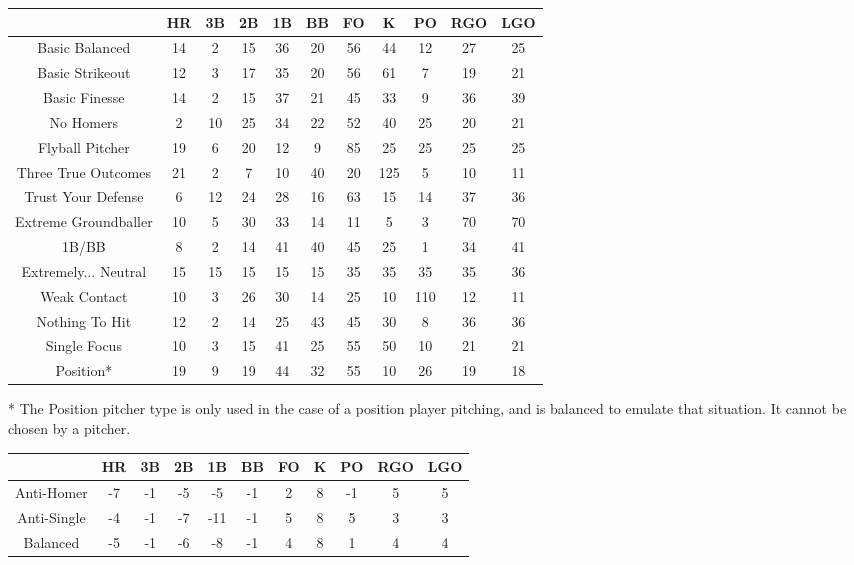 \begin{center}
    \begin{tabular}{|c|c|c|c|c|c|c|c|c|c|c|}
		\hline
        & HR & 3B & 2B & 1B & BB & FO & K   & PO & RGO & LGO    \\
        \hline
Basic Balanced & 14 & 2 & 15 & 36 & 20 & 56 & 44 & 12 & 27 & 25 \\
\hline
Basic Strikeout & 12 & 3 & 17 & 35 & 20 & 56 & 61 & 7 & 19 & 21 \\
\hline
Basic Finesse & 14 & 2 & 15 & 37 & 21 & 45 & 33 & 9 & 36 & 39 \\
\hline
No Homers & 2 & 10 & 25 & 34 & 22 & 52 & 40 & 25 & 20 & 21 \\
\hline
Flyball Pitcher & 19 & 6 & 20 & 12 & 9 & 85 & 25 & 25 & 25 & 25 \\
\hline
Three True Outcomes & 21 & 2 & 7 & 10 & 40 & 20 & 125 & 5 & 10 & 11 \\
\hline
Trust Your Defense & 6 & 12 & 24 & 28 & 16 & 63 & 15 & 14 & 37 & 36 \\
\hline
Extreme Groundballer & 10 & 5 & 30 & 33 & 14 & 11 & 5 & 3 & 70 & 70 \\
\hline
1B/BB & 8 & 2 & 14 & 41 & 40 & 45 & 25 & 1 & 34 & 41 \\
\hline
Extremely... Neutral & 15 & 15 & 15 & 15 & 15 & 35 & 35 & 35 & 35 & 36 \\
\hline
Weak Contact & 10 & 3 & 26 & 30 & 14 & 25 & 10 & 110 & 12 & 11 \\
\hline
Nothing To Hit & 12 & 2 & 14 & 25 & 43 & 45 & 30 & 8 & 36 & 36 \\
\hline
Single Focus & 10 & 3 & 15 & 41 & 25 & 55 & 50 & 10 & 21 & 21 \\
\hline
Position* & 19 & 9 & 19 & 44 & 32 & 55 & 10 & 26 & 19 & 18 \\
\hline
    \end{tabular}
\end{center}

* The Position pitcher type is only used in the case of a position player pitching, 
and is balanced to emulate that situation. It cannot be chosen by a pitcher.

\begin{center}
    \begin{tabular}{|c|c|c|c|c|c|c|c|c|c|c|}
		\hline
        & HR & 3B & 2B & 1B & BB & FO & K   & PO & RGO & LGO    \\
        \hline
        Anti-Homer & -7 & -1 & -5 & -5 & -1 & 2 & 8 & -1 & 5 & 5 \\
        \hline 
        Anti-Single & -4 & -1 & -7 & -11 & -1 & 5 & 8 & 5 & 3 & 3 \\
        \hline
        Balanced & -5 & -1 & -6 & -8 & -1 & 4 & 8 & 1 & 4 & 4 \\
        \hline
    \end{tabular}
\end{center}